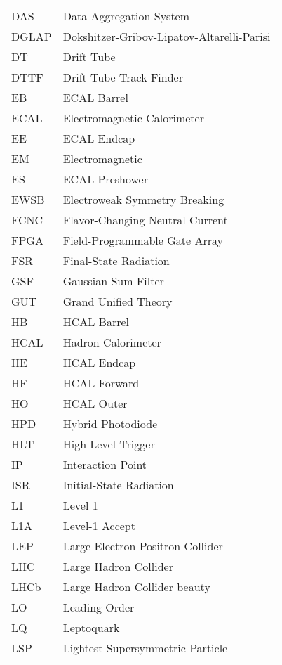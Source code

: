 \begin{longtable}[l]{@{}l@{\ \ \ \ \ \ \ \ \ \ \ \ }l}
DAS        & Data Aggregation System \\
DGLAP      & Dokshitzer-Gribov-Lipatov-Altarelli-Parisi \\
DT         & Drift Tube \\
DTTF       & Drift Tube Track Finder \\
EB         & ECAL Barrel \\
ECAL       & Electromagnetic Calorimeter \\
EE         & ECAL Endcap \\
EM         & Electromagnetic \\
ES         & ECAL Preshower \\
EWSB       & Electroweak Symmetry Breaking \\
FCNC       & Flavor-Changing Neutral Current \\
FPGA       & Field-Programmable Gate Array \\
FSR        & Final-State Radiation \\
GSF        & Gaussian Sum Filter \\
GUT        & Grand Unified Theory \\
HB         & HCAL Barrel \\
HCAL       & Hadron Calorimeter \\
HE         & HCAL Endcap \\
HF         & HCAL Forward \\
HO         & HCAL Outer \\
HPD        & Hybrid Photodiode \\
HLT        & High-Level Trigger \\
IP         & Interaction Point \\
ISR        & Initial-State Radiation \\
L1         & Level 1 \\
L1A        & Level-1 Accept \\
LEP        & Large Electron-Positron Collider \\
LHC        & Large Hadron Collider \\
LHCb       & Large Hadron Collider beauty \\
LO         & Leading Order \\
LQ         & Leptoquark \\
LSP        & Lightest Supersymmetric Particle \\

\end{longtable}
